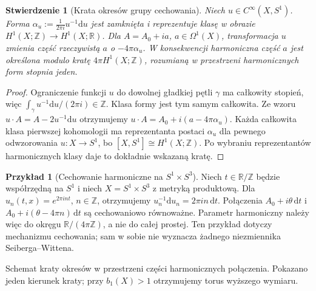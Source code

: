 \documentclass[11pt,a4paper]{report}
\numberwithin{equation}{section}
\theoremstyle{plain}
\newtheorem{stwierdzenie}[twierdzenie]{Stwierdzenie}
\theoremstyle{definition}
\newtheorem{przyklad}[twierdzenie]{Przykład}
\theoremstyle{remark}
\begin{document}
\begin{stwierdzenie}[Krata okresów grupy cechowania]
\label{prop:tg-sw12-lattice}
Niech $u\in C^\infty(X,S^1)$. Forma
$\alpha_u:=\frac{1}{2\pi i}u^{-1}\mathrm du$ jest zamknięta
i reprezentuje klasę w obrazie
$H^1(X;\mathbb Z)\to H^1(X;\mathbb R)$.
Dla $A=A_0+i a$, $a\in\Omega^1(X)$, transformacja $u$
zmienia część rzeczywistą $a$ o $-4\pi\alpha_u$.
W konsekwencji harmoniczna część $a$ jest określona
modulo kratę $4\pi H^1(X;\mathbb Z)$, rozumianą
w przestrzeni harmonicznych form stopnia jeden.
\end{stwierdzenie}

\begin{proof}
Ograniczenie funkcji $u$ do dowolnej gładkiej pętli
$\gamma$ ma całkowity stopień, więc
$\int_\gamma u^{-1}\mathrm du/(2\pi i)\in\mathbb Z$.
Klasa formy jest tym samym całkowita. Ze wzoru
$u\cdot A=A-2u^{-1}\mathrm du$ otrzymujemy
$u\cdot A=A_0+i(a-4\pi\alpha_u)$.
Każda całkowita klasa pierwszej kohomologii ma reprezentanta
postaci $\alpha_u$ dla pewnego odwzorowania $u:X\to S^1$,
bo $[X,S^1]\cong H^1(X;\mathbb Z)$. Po wybraniu
reprezentantów harmonicznych klasy daje to dokładnie
wskazaną kratę.
\end{proof}

\begin{przyklad}[Cechowanie harmoniczne na $S^1\times S^3$]
Niech $t\in\mathbb R/\mathbb Z$ będzie współrzędną na
$S^1$ i niech $X=S^1\times S^3$ z metryką produktową.
Dla $u_n(t,x)=e^{2\pi int}$, $n\in\mathbb Z$,
otrzymujemy $u_n^{-1}\mathrm du_n=2\pi in\,\mathrm dt$.
Połączenia $A_0+i\theta\,\mathrm dt$ i
$A_0+i(\theta-4\pi n)\,\mathrm dt$ są cechowaniowo
równoważne. Parametr harmoniczny należy więc do okręgu
$\mathbb R/(4\pi\mathbb Z)$, a nie do całej prostej.
Ten przykład dotyczy mechanizmu cechowania; sam w sobie
nie wyznacza żadnego niezmiennika Seiberga--Wittena.
\end{przyklad}

\begin{center}

{\footnotesize Schemat kraty okresów w przestrzeni części harmonicznych
połączenia. Pokazano jeden kierunek kraty; przy $b_1(X)>1$
otrzymujemy torus wyższego wymiaru.}
\end{center}
\end{document}
